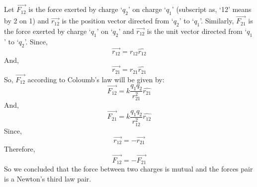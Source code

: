 Let $\vec{F_{12}}$ is the force exerted by charge `$q_{2}$' on charge `$q_{1}$' (subscript as, `12' means by 2 on 1)
and $\vec{r_{12}}$ is the position vector directed from `$q_{2}$' to `$q_{1}$'.
Similarly, $\vec{F_{21}}$  is the force exerted by charge `$q_{1}$' on `$q_{2}$' and  $\vec{r_{12}}$ is
the unit vector directed from `$q_{1}$' to `$q_{2}$'.
Since,
\begin{equation}
  \vec{r_{12}} = r_{12} \hat{r_{12}} \nonumber
\end{equation}
And,
\begin{equation}
  \vec{r_{21}} = r_{21} \hat{r_{21}} \nonumber
\end{equation}
So, $\vec{F_{12}}$ according to Coloumb's law will be given by:
\begin{equation}
  \vec{F_{12}} = k \frac{q_{1}q_{2}}{r_{21}^{2}} \hat{r_{21}} \nonumber
\end{equation}
And,
\begin{equation}
  \vec{F_{21}} = k \frac{q_{1}q_{2}}{r_{12}^{2}} \hat{r_{12}} \nonumber
\end{equation}
Since,
\begin{equation}
  \vec{r_{12}} = -\vec{r_{21}} \nonumber
\end{equation}
Therefore,
\begin{equation}
  \vec{F_{12}} = -\vec{F_{21}} \nonumber
\end{equation}
So we concluded that the force between two charges is
mutual and the forces pair is a Newton's third law pair.

